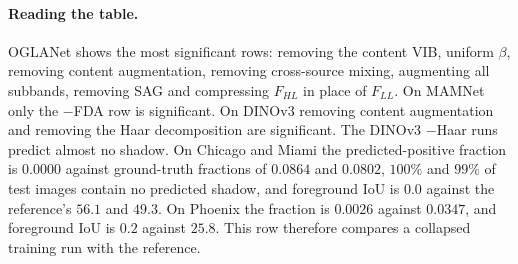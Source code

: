 \paragraph{Reading the table.} OGLANet shows the most significant rows: removing the content VIB, uniform $\beta$, removing content augmentation, removing cross-source mixing, augmenting all subbands, removing SAG and compressing $F_{HL}$ in place of $F_{LL}$. On MAMNet only the $-$FDA row is significant. On DINOv3 removing content augmentation and removing the Haar decomposition are significant. The DINOv3 $-$Haar runs predict almost no shadow. On Chicago and Miami the predicted-positive fraction is $0.0000$ against ground-truth fractions of $0.0864$ and $0.0802$, $100\%$ and $99\%$ of test images contain no predicted shadow, and foreground IoU is $0.0$ against the reference's $56.1$ and $49.3$. On Phoenix the fraction is $0.0026$ against $0.0347$, and foreground IoU is $0.2$ against $25.8$. This row therefore compares a collapsed training run with the reference.
